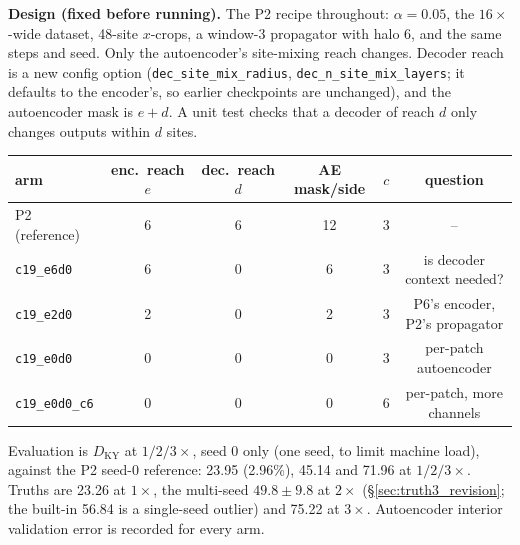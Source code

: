 \documentclass[11pt]{article}
\begin{document}
\textbf{Design (fixed before running).} The P2 recipe throughout:
$\alpha{=}0.05$, the $16\times$-wide dataset, 48-site $x$-crops, a
window-3 propagator with halo 6, and the same steps and seed. Only the
autoencoder's site-mixing reach changes. Decoder reach is a new config
option (\texttt{dec\_site\_mix\_radius}, \texttt{dec\_n\_site\_mix\_layers};
it defaults to the encoder's, so earlier checkpoints are unchanged), and
the autoencoder mask is $e{+}d$. A unit test checks that a decoder of
reach $d$ only changes outputs within $d$ sites.
\begin{center}
\small
\begin{tabular}{lccccc}
\toprule
arm & enc.\ reach $e$ & dec.\ reach $d$ & AE mask/side & $c$ & question \\
\midrule
P2 (reference) & 6 & 6 & 12 & 3 & -- \\
\texttt{c19\_e6d0} & 6 & 0 & 6 & 3 & is decoder context needed? \\
\texttt{c19\_e2d0} & 2 & 0 & 2 & 3 & P6's encoder, P2's propagator \\
\texttt{c19\_e0d0} & 0 & 0 & 0 & 3 & per-patch autoencoder \\
\texttt{c19\_e0d0\_c6} & 0 & 0 & 0 & 6 & per-patch, more channels \\
\bottomrule
\end{tabular}
\end{center}
Evaluation is $D_{\mathrm{KY}}$ at $1/2/3\times$, seed 0 only (one seed,
to limit machine load), against the P2 seed-0 reference: 23.95 (2.96\%),
45.14 and 71.96 at $1/2/3\times$. Truths are 23.26 at $1\times$, the
multi-seed $49.8\pm9.8$ at $2\times$ (\S\ref{sec:truth3_revision}; the
built-in 56.84 is a single-seed outlier) and 75.22 at $3\times$.
Autoencoder interior validation error is recorded for every arm.
\end{document}
